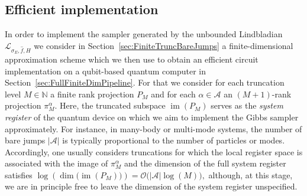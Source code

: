 \documentclass[11pt]{amsart}
\newcommand{\1}{\mathbbm{1}}
\newcommand{\N}{\mathbb{N}}
\newcommand{\cL}{\mathcal{L}}
\newcommand{\cA}{\mathcal{A}}
\newcommand{\bin}[1]{}
\theoremstyle{plain}
\theoremstyle{definition}
\theoremstyle{remark}
\numberwithin{equation}{section}
\begin{document}
\bin{\subsection{Efficient implementations}


\noindent Our discussion thus far clearly illustrates the tension between the rate at which the sampler generated by
$\mathcal{L}_{\sigma_E,\widehat{f},H}$ converges to its equilibrium Gibbs state and the amount of resources required for its implementation as a quantum circuit: while smooth, rapidly decaying functions are required to justify the integral representation \eqref{def:Lalpha} of the jumps \(L^\alpha\)—with faster decay leading to shorter circuit implementations—such conditions on \(f\) result in gapless generators, a signature of non-convergent dynamics. }








\bin{ the present continuous variable setting, the bare jumps $a_i,a_i^\dagger$ are unbounded, which renders the question of their block encoding non-trivial.  }



\subsection{Efficient implementation}

In order to implement the sampler generated by the unbounded Lindbladian  $\cL_{\sigma_E,\widehat f,H}$ we consider in Section~\ref{sec:FiniteTruncBareJumps} a finite-dimensional approximation scheme which we then use to obtain an efficient circuit implementation on a qubit-based quantum computer in Section~\ref{sec:FullFiniteDimPipeline}. For that we consider for each truncation level $M\in\N$ a finite rank projection  $P_M$ and for each $\alpha\in\cA$ an $(M+1)$-rank projection $\pi^\alpha_M.$ Here, the truncated subspace $\operatorname{im}(P_M)$ serves as the \emph{system register} of the quantum device on which we aim to implement the Gibbs sampler approximately. For instance, in many-body or multi-mode systems, the number of bare jumps $|\mathcal{A}|$ is typically proportional to the number of particles or modes. Accordingly, one usually considers truncations for which the local register space is associated with the image of $\pi^\alpha_M$ and the dimension of the full system register satisfies
$
\log\left( \dim\bigl(\operatorname{im}(P_M)\bigr)\right)
= \mathcal{O}\bigl(|\mathcal{A}|\log(M)\bigr),
$ although, at this stage, we are in principle free to leave the dimension of the system register unspecified.
\end{document}
